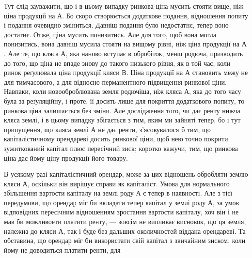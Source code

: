 Тут слід зауважити, що і в цьому випадку ринкова ціна мусить стояти
вище, ніж ціна продукції на $А$. Бо скоро створюється додаткове подання, відношення
попиту і подання очевидно зміниться. Давніш подання було недостатнє,
тепер воно достатнє. Отже, ціна мусить понизитись. Але для того, щоб вона могла
понизитись, вона давніш мусила стояти на вищому рівні, ніж ціна продукції на $А$.
Але те, що кляса $А$, яка наново вступає в обробіток, менш родюча, призводить до
того, що ціна не впаде знову до такого низького рівня, як в той час, коли ринок
реґулювала ціна продукції кляси $В$. Ціна продукції на $А$ становить межу не для
тимчасового, а для відносно перманентного підвищення ринкової ціни. — Навпаки,
коли новооброблювана земля родючіша, ніж кляса $А$, яка до того часу була за
реґуляційну, і проте, її досить лише для покриття додаткового попиту, то ринкова
ціна залишається без зміни. Але дослідження того, чи дає ренту нижча
кляса землі, і в цьому випадку збігається з тим, яким ми зайняті тепер, бо
і тут припущення, що кляса землі $А$ не дає ренти, з’ясовувалося б тим, що
капіталістичному орендареві досить ринкової ціни, щоб нею точно покрити
зужиткований капітал плюс пересічний зиск; коротко кажучи, тим, що ринкова
ціна дає йому ціну продукції його товару.

В усякому разі капіталістичний орендар, може за цих відношень обробляти
землю кляси $А$, оскільки він вирішує справи як капіталіст. Умова для
нормального збільшення вартости капіталу на землі роду $А$ є тепер в наявності.
Але з тієї передумови, що орендар міг би вкладати тепер капітал у землі
роду $А$, за умов відповідних пересічним відношенням зростання вартости капіталу,
хоч він і не мав би можливоети платити ренту, — зовсім не випливає
висновок, що ця земля, належна до кляси $А$, так і буде без дальших околичностей
віддана орендареві. Та обставина, що орендар міг би використати свій
капітал з звичайним зиском, коли йому не доводиться платити ренти, для
\parbreak{}  %

